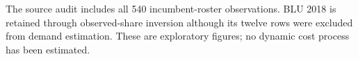 \documentclass[10pt,]{article}
\begin{document}
The source audit includes all 540 incumbent-roster observations. BLU
2018 is retained through observed-share inversion although its twelve
rows were excluded from demand estimation. These are exploratory
figures; no dynamic cost process has been estimated.


\end{document}
